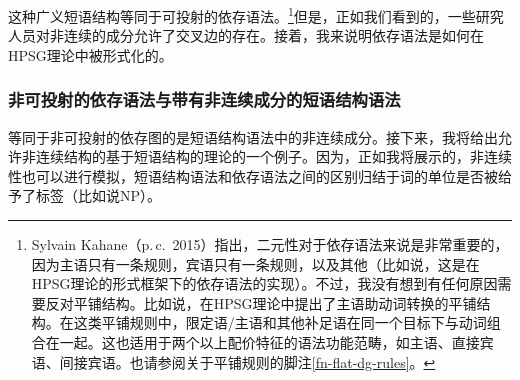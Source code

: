 这种广义短语结构等同于可投射的依存语法。\footnote{\label{fn-dg-binary-branching}%
Sylvain Kahane（p.\,c.\, 2015）指出，二元性对于依存语法来说是非常重要的，因为主语只有一条规则，宾语只有一条规则，以及其他（比如说\citealp{Kahane2009a}，这是在HPSG理论的形式框架下的依存语法的实现）。不过，我没有想到有任何原因需要反对平铺结构。比如说，\citet[]{GSag2000a-u}在HPSG理论中提出了主语助动词转换的平铺结构。在这类平铺规则中，限定语/主语和其他补足语在同一个目标下与动词组合在一起。这也适用于两个以上配价特征的语法功能范畴，如主语、直接宾语、间接宾语。也请参阅关于平铺规则的脚注\ref{fn-flat-dg-rules}。
}但是，正如我们看到的，一些研究人员对非连续的成分允许了交叉边的存在。接着，我来说明依存语法是如何在HPSG理论中被形式化的。

\subsubsection{非可投射的依存语法与带有非连续成分的短语结构语法}
\label{sec-discontinuous-constituents-HPSG}

等同于非可投射的依存图的是短语结构语法中的非连续成分。接下来，我将给出允许非连续结构的基于短语结构的理论的一个例子。因为，正如我将展示的，非连续性也可以进行模拟，短语结构语法和依存语法之间的区别归结于词的单位是否被给予了标签（比如说NP）。

